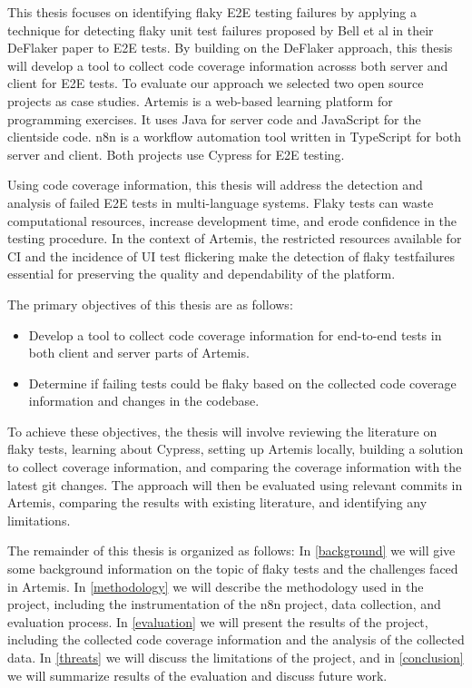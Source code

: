 This thesis focuses on identifying flaky \Ac{E2E} testing failures by applying a technique for detecting flaky unit test failures proposed by Bell et al in their DeFlaker paper \cite{bell_d_2018} to \ac{E2E} tests. By building on the DeFlaker approach, this thesis will develop a tool to collect code coverage information acrosss both server and client for \ac{E2E} tests. To evaluate our approach we selected two open source projects as case studies. Artemis \cite{krusche_artemis_2018} is a web-based learning platform for programming exercises. It uses Java for server code and JavaScript for the clientside code. n8n \cite{noauthor_n8n_2023} is a workflow automation tool written in TypeScript for both server and client. Both projects use Cypress \cite{noauthor_cypress-iocypress_2023} for \ac{E2E} testing.

Using code coverage information, this thesis will address the detection and analysis of failed \ac{E2E} tests in multi-language systems. Flaky tests can waste computational resources, increase development time, and erode confidence in the testing procedure. In the context of Artemis, the restricted resources available for CI and the incidence of UI test flickering make the detection of flaky testfailures essential for preserving the quality and dependability of the platform.

The primary objectives of this thesis are as follows:
\begin{itemize}
	\item Develop a tool to collect code coverage information for end-to-end tests in both client and server parts of Artemis.
	\item Determine if failing tests could be flaky based on the collected code coverage information and changes in the codebase.
\end{itemize}
To achieve these objectives, the thesis will involve reviewing the literature on flaky tests, learning about Cypress, setting up Artemis locally, building a solution to collect coverage information, and comparing the coverage information with the latest git changes. The approach will then be evaluated using relevant commits in Artemis, comparing the results with existing literature, and identifying any limitations.

The remainder of this thesis is organized as follows:
In \cref{background} we will give some background information on the topic of flaky tests and the challenges faced in Artemis. 
In \cref{methodology} we will describe the methodology used in the project, including the instrumentation of the n8n project, data collection, and evaluation process. 
In \cref{evaluation} we will present the results of the project, including the collected code coverage information and the analysis of the collected data. 
In \cref{threats} we will discuss the limitations of the project, and in \cref{conclusion} we will summarize results of the evaluation and discuss future work.

